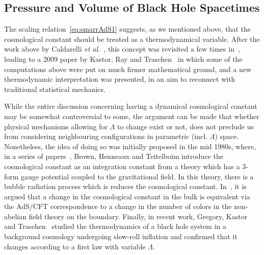 \documentclass[
twoside,
openright,
frontopenright
]{dmathesis}
\begin{document}
\subsection{Pressure and Volume of Black Hole Spacetimes}
\label{sec:press-volume-black}

The scaling relation~\eqref{eq:smarrAdS1} suggests, as we mentioned above, that
the cosmological constant should be treated as a thermodynamical variable. After
the work above by Caldarelli \emph{et al.}~\cite{Caldarelli:1999xj}, this
concept was revisited a few times
in~\cite{Wang:2006eb,Sekiwa:2006qj,Wang:2006bn,LarranagaRubio:2007fly}, leading
to a 2009 paper by Kastor, Ray and Traschen~\cite{Kastor:2009wy} in which some
of the computations above were put on much firmer mathematical ground, and a
new thermodynamic interpretation was presented, in an aim to reconnect with
traditional statistical mechanics.

While the entire discussion concerning having a dynamical cosmological constant
may be somewhat controversial to some, the argument can be made that whether
physical mechanisms allowing for $\Lambda$ to change exist or not, does not
preclude us from considering neighbouring configurations in parametric
(incl. $\Lambda$) space. Nonetheless, the idea of doing so was initially
proposed in the mid 1980s, where, in a series of papers~\cite{Henneaux:1984ji,
  Teitelboim:1985dp, Henneaux:1985tv, Brown:1987dd, Brown:1988kg,
  Henneaux:1989zc}, Brown, Henneaux and Teitelboim introduce the cosmological
constant as an integration constant from a theory which has a 3-form gauge
potential coupled to the gravitational field. In this theory, there is a bubble
radiation process which is reduces the cosmological
constant. In~\cite{Kastor:2009wy}, it is argued that a change in the
cosmological constant in the bulk is equivalent via the AdS/CFT correspondence
to a change in the number of colors in the non-abelian field theory on the
boundary. Finally, in recent work, Gregory, Kastor and
Traschen~\cite{Gregory:2017sor,Gregory:2018ghc} studied the thermodynamics of a
black hole system in a background cosmology undergoing slow-roll inflation and
confirmed that it changes according to a first law with variable $\Lambda$.
\end{document}
